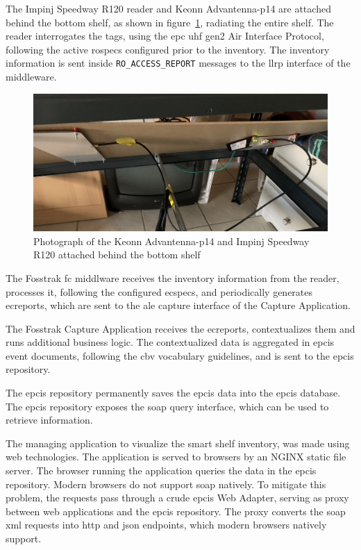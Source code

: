 The Impinj Speedway R120 reader and Keonn Advantenna-p14 are attached behind the bottom shelf, as shown in figure~\ref{fig:shelvephoto}, radiating the entire shelf.
The reader interrogates the tags, using the \ac{epc} \ac{uhf} \ac{gen2} Air Interface Protocol, following the active \acp{rospec} configured prior to the inventory.
The inventory information is sent inside \texttt{RO\_ACCESS\_REPORT} messages to the \ac{llrp} interface of the middleware.

\begin{figure}
    \centering
    \includegraphics[width=\textwidth]{figs/completeshelve_photo.jpeg}
    \caption{Photograph of the Keonn Advantenna-p14 and Impinj Speedway R120 attached behind the bottom shelf}
    \label{fig:shelvephoto}
\end{figure}

The Fosstrak \ac{fc} middlware receives the inventory information from the reader, processes it, following the configured \acp{ecspec}, and periodically generates \acp{ecreport}, which are sent to the \ac{ale} capture interface of the Capture Application.

The Fosstrak Capture Application receives the \acp{ecreport}, contextualizes them and runs additional business logic. The contextualized data is aggregated in \acs{epcis} event documents, following the \ac{cbv} vocabulary guidelines, and is sent to the \ac{epcis} repository.

The \ac{epcis} repository permanently saves the \ac{epcis} data into the \ac{epcis} database. The \ac{epcis} repository exposes the \ac{soap} query interface, which can be used to retrieve information.

The managing application to visualize the smart shelf inventory, was made using web technologies. The application is served to browsers by an NGINX static file server. The browser running the application queries the data in the \ac{epcis} repository.
Modern browsers do not support \ac{soap} natively. 
To mitigate this problem, the requests pass through a crude \ac{epcis} Web Adapter, serving as proxy between web applications and the \ac{epcis} repository. 
The proxy converts the \ac{soap} \ac{xml} requests into \ac{http} and \ac{json} endpoints, which modern browsers natively support.

